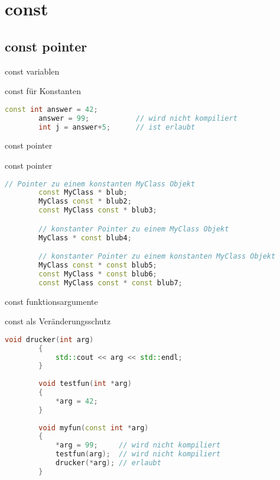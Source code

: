 \section{const}

\subsection{const pointer}

\begin{frame}[fragile]{const variablen}

	\begin{block}{const für Konstanten}
	\begin{lstlisting}[language=C++]
		const int answer = 42;
		answer = 99;           // wird nicht kompiliert
		int j = answer+5;      // ist erlaubt
	\end{lstlisting}
	\end{block}

\end{frame}


\begin{frame}[fragile]{const pointer}

	\begin{block}{const pointer}
	\begin{small}
	\begin{lstlisting}[language=C++]
		// Pointer zu einem konstanten MyClass Objekt
		const MyClass * blub;
		MyClass const * blub2;
		const MyClass const * blub3;

		// konstanter Pointer zu einem MyClass Objekt
		MyClass * const blub4;

		// konstanter Pointer zu einem konstanten MyClass Objekt
		MyClass const * const blub5; 
		const MyClass * const blub6; 
		const MyClass const * const blub7;
	\end{lstlisting}
	\end{small}
	\end{block}

\end{frame}


\begin{frame}[fragile]{const funktionsargumente}

	\begin{block}{const als Veränderungsschutz}
	\begin{small}
	\begin{lstlisting}[language=C++]
		void drucker(int arg)
		{
		    std::cout << arg << std::endl;
		}
		
		void testfun(int *arg)
		{
		    *arg = 42;
		}
		
		void myfun(const int *arg)
		{
		    *arg = 99;     // wird nicht kompiliert
		    testfun(arg);  // wird nicht kompiliert
		    drucker(*arg); // erlaubt
		}
	\end{lstlisting}
	\end{small}
	\end{block}

\end{frame}


